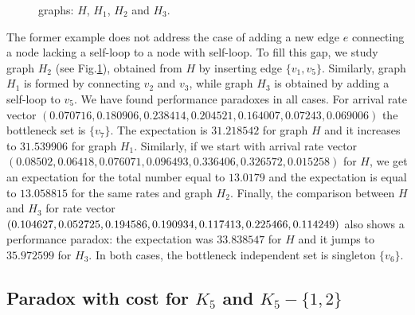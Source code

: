 \documentclass[11pt]{article}
\begin{document}
{\begin{figure}[htbp]
\caption{graphs: $H$, $H_1$, $H_2$ and $H_3$. }
\label{fig:graphs_example2}
\end{figure}
The former example does not address the case of adding a new edge $e$ connecting a node lacking a self-loop to a node with self-loop. To fill this gap, we study graph $H_2$ (see Fig.\ref{fig:graphs_example2}),  obtained from $H$ by inserting edge $\{v_1,v_5\}$. Similarly, graph $H_1$ is formed by connecting $v_2$ and $v_3$, while graph $H_3$ is obtained by adding a self-loop to {$v_5$}. We have found performance paradoxes in all cases.
For arrival rate vector 
$( 0.070716, 0.180906, 0.238414, 0.204521,  0.164007, 0.07243, 
0.069006)$
the bottleneck set is $\{v_7\}$. The expectation is $31.218542$ for graph $H$ 
and it increases to 
$ 31.539906$ for graph $H_1$.  
Similarly, if we start with arrival rate vector 
$( 0.08502,  0.06418,  0.076071,  0.096493,  0.336406, 0.326572, 0.015258)$
for $H$, we get an expectation for the total number equal to $13.0179$ and the expectation is equal to $13.058815$ for the same rates and graph $H_2$. Finally, 
the comparison between $H$ and $H_3$ for rate vector $(0.104627, 0.052725,  0.194586, 0.190934, 0.117413, 0.225466,\\ 0.114249)$ also shows a performance
paradox: the expectation was $33.838547$ for $H$ and it jumps to $35.972599$ for $H_3$. In both cases, the bottleneck independent  set is singleton $\{v_6 \}$. 

\subsection{Paradox with cost for $K_5$ and $K_5-\{1,2\}$}
\begin{figure} [htbp]
\begin{center} 
\end{center}
\end{figure}}
\end{document}
